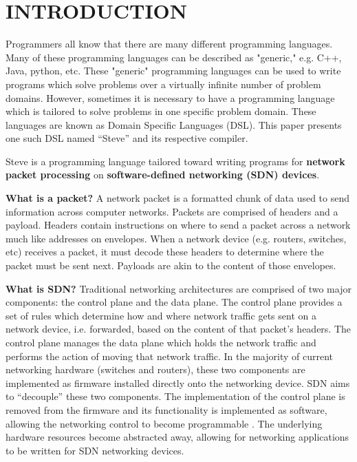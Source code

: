 \chapter{INTRODUCTION} \label{ch:intro}

Programmers all know that there are many different programming languages. Many of these programming languages can be described as "generic," e.g. C++, Java, python, etc.  These "generic" programming languages can be used to write programs which solve problems over a virtually infinite number of problem domains. However, sometimes it is necessary to have a programming language which is tailored to solve problems in one specific problem domain. These languages are known as Domain Specific Languages (DSL). This paper presents one such DSL named “Steve” and its respective compiler.

Steve is a programming language tailored toward writing programs for \textbf{network packet processing} on \textbf{software-defined networking (SDN) devices}.

\textbf{What is a packet?} A network packet is a formatted chunk of data used to send information across computer networks. Packets are comprised of headers and a payload. Headers contain instructions on where to send a packet across a network much like addresses on envelopes. When a network device (e.g. routers, switches, etc) receives a packet, it must decode these headers to determine where the packet must be sent next. Payloads are akin to the content of those envelopes. 

\textbf{What is SDN?} Traditional networking architectures are comprised of two major components: the control plane and the data plane. The control plane provides a set of rules which determine how and where network traffic gets sent on a network device, i.e. forwarded, based on the content of that packet’s headers. The control plane manages the data plane which holds the network traffic and performs the action of moving that network traffic. In the majority of current networking hardware (switches and routers), these two components are implemented as firmware installed directly onto the networking device. SDN aims to “decouple” these two components. The implementation of the control plane is removed from the firmware and its functionality is implemented as software, allowing the networking control to become programmable \cite{onf_sdn_def}. The underlying hardware resources become abstracted away, allowing for networking applications to be written for SDN networking devices.

